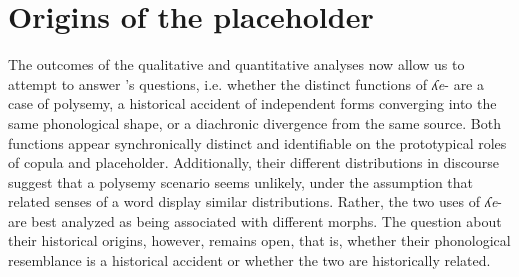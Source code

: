 \documentclass[output=paper,colorlinks,citecolor=brown
\ChapterDOI{10.5281/zenodo.15697581}
]{langscibook}
\begin{document}



\section{Origins of the placeholder} \label{sec_origins}

The outcomes of the qualitative and quantitative analyses now allow us to attempt to answer \citet{Epps2008a}'s questions, i.e. whether the distinct functions of \textit{ʎe}- are a case of polysemy, a historical accident of independent forms converging into the same phonological shape, or a diachronic divergence from the same source. 
Both functions appear synchronically distinct and identifiable on the prototypical roles of copula and placeholder. 
Additionally, their different distributions in discourse suggest that a polysemy scenario seems unlikely, under the assumption that related senses of a word display similar distributions. 
Rather, the two uses of \textit{ʎe}- are best analyzed as being associated with different morphs. 
The question about their historical origins, however, remains open, that is, whether their phonological resemblance is a historical accident or whether the two are historically related.
\end{document}
